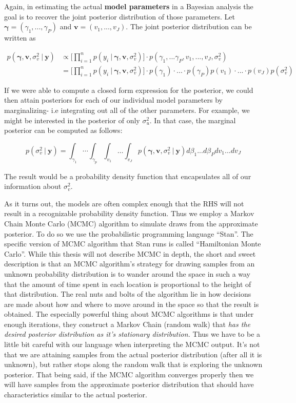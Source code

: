 \documentclass[12pt,twoside]{reedthesis}
\begin{document}
Again, in estimating the actual \textbf{model parameters} in a Bayesian analysis the goal is to recover the joint posterior distribution of those parameters. Let \(\boldsymbol{\gamma} = (\gamma_1, ...,\gamma_P)\) and \(\mathbf{v} = (v_1, ..., v_J)\). The joint posterior distribution can be written as

\[
\begin{aligned}
p(\boldsymbol{\gamma}, \mathbf{v},  \sigma_v^2 \ | \ \mathbf{y}) &\propto \bigg[\prod_{i=1}^np(y_i \ | \ \boldsymbol{\gamma}, \mathbf{v},  \sigma_v^2)\bigg]\cdot p(\gamma_1, ...\gamma_P, v_1,... ,v_J, \sigma_{v}^2) \\
 &= \bigg[\prod_{i=1}^np(y_i \ | \ \boldsymbol{\gamma}, \mathbf{v},  \sigma_{v}^2)\bigg]\cdot p(\gamma_1)\cdot...\cdot p(\gamma_P)p(v_1) \cdot ... \cdot p(v_J)p(\sigma_{v}^2)
\end{aligned}
\]

If we were able to compute a closed form expression for the posterior, we could then attain posteriors for each of our individual model parameters by marginalizing- i.e integrating out all of the other parameters. For example, we might be interested in the posterior of only \(\sigma_u^2\). In that case, the marginal posterior can be computed as follows:

\[
p(\sigma_{v}^2 \ | \ \mathbf{y}) = \int_{\gamma_1} \cdots \int_{\gamma_p} \int_{v_1} \dots \int_{v_J} p(\boldsymbol{\gamma}, \mathbf{v},  \sigma_{v}^2 \ | \ \mathbf{y}) d\beta_1 ... d\beta_P dv_1 ... dv_J
\]

The result would be a probability density function that encapsulates all of our information about \(\sigma_{v}^2\).

As it turns out, the models are often complex enough that the RHS will not result in a recognizable probability density function. Thus we employ a Markov Chain Monte Carlo (MCMC) algorithm to simulate draws from the approximate posterior. To do so we use the probabilistic programming language ``Stan''. The specific version of MCMC algorithm that Stan runs is called ``Hamiltonian Monte Carlo''. While this thesis will not describe MCMC in depth, the short and sweet description is that an MCMC algorithm's strategy for drawing samples from an unknown probability distribution is to wander around the space in such a way that the amount of time spent in each location is proportional to the height of that distribution. The real nuts and bolts of the algorithm lie in how decisions are made about how and where to move around in the space so that the result is obtained. The especially powerful thing about MCMC algorithms is that under enough iterations, they construct a Markov Chain (random walk) that \emph{has the desired posterior distribution as it's stationary distribution.} Thus we have to be a little bit careful with our language when interpreting the MCMC output. It's not that we are attaining samples from the actual posterior distribution (after all it is unknown), but rather stops along the random walk that is exploring the unknown posterior. That being said, if the MCMC algorithm converges properly then we will have samples from the approximate posterior distribution that should have characteristics similar to the actual posterior.
\end{document}

